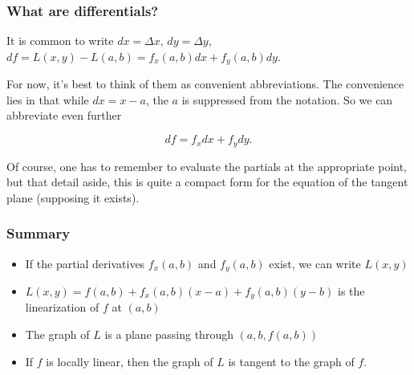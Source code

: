 \documentclass[11pt,ignorenonframetext,]{beamer}
\begin{document}
\begin{frame}\frametitle{What are differentials?}

It is common to write $dx = \Delta x$, $dy = \Delta y$,
$df = L(x,y) - L(a,b) = f_x(a,b) dx + f_y(a,b) dy$.

For now, it's best to think of them as convenient abbreviations. The
convenience lies in that while $dx = x-a$, the $a$ is suppressed from
the notation. So we can abbreviate even further

\[ df = f_x dx + f_y dy. \]

Of course, one has to remember to evaluate the partials at the
appropriate point, but that detail aside, this is quite a compact form
for the equation of the tangent plane (supposing it exists).

\end{frame}

\begin{frame}\frametitle{Summary}

\begin{itemize}[<+->]
\itemsep1pt\parskip0pt
\item
  If the partial derivatives $f_x(a,b)$ and $f_y(a,b)$ exist, we can
  write $L(x,y)$
\item
  $L(x,y) = f(a,b) + f_x(a,b)(x-a) + f_y(a,b)(y-b)$ is the linearization
  of $f$ at $(a,b)$
\item
  The graph of $L$ is a plane passing through $(a,b,f(a,b))$
\item
  If $f$ is locally linear, then the graph of $L$ is tangent to the
  graph of $f$.
\end{itemize}

\end{frame}
\end{document}
